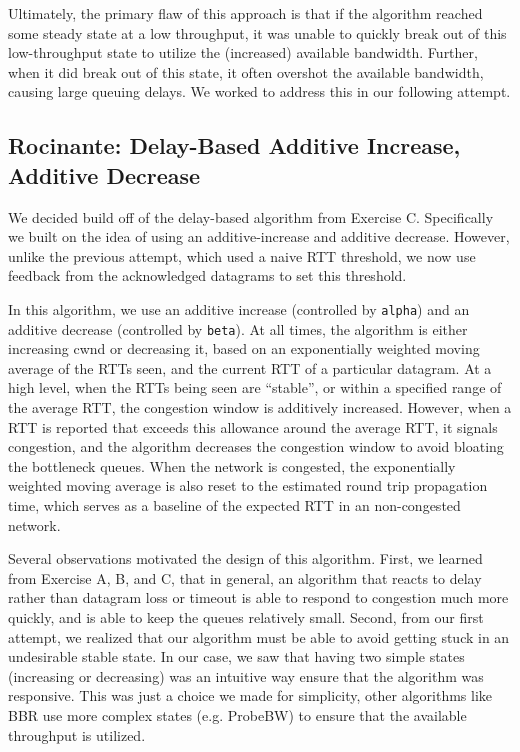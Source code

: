 \documentclass[twoside]{article}
\begin{document}
Ultimately, the primary flaw of this approach is that if the algorithm reached
some steady state at a low throughput, it was unable to quickly break out of
this low-throughput state to utilize the (increased) available bandwidth. Further,
when it did break out of this state, it often overshot the available bandwidth, causing
large queuing delays. We worked to address this in our following attempt.

\subsection*{Rocinante: Delay-Based Additive Increase, Additive Decrease}

We decided build off of the delay-based algorithm from
Exercise C. Specifically we built on the idea of using an additive-increase
and additive decrease. However, unlike the previous attempt, which used a
naive RTT threshold, we now use feedback from the acknowledged datagrams to set
this threshold.

In this algorithm, we use an additive increase (controlled by \texttt{alpha})
and an additive decrease (controlled by \texttt{beta}). At all times, the
algorithm is either increasing cwnd or decreasing it, based on an
exponentially weighted moving average of the RTTs seen, and the current RTT
of a particular datagram. At a high level, when the RTTs being seen are
``stable'', or within a specified range of the average RTT, the congestion
window is additively increased. However, when a RTT is reported that exceeds
this allowance around the average RTT, it signals congestion, and the algorithm
decreases the congestion window to avoid bloating the bottleneck queues.
When the network is congested, the exponentially weighted moving average is
also reset to the estimated round trip propagation time, which serves as a
baseline of the expected RTT in an non-congested network.

Several observations motivated the design of this algorithm. First, we learned
from Exercise A, B, and C, that in general, an algorithm that reacts to delay
rather than datagram loss or timeout is able to respond to congestion much more
quickly, and is able to keep the queues relatively small.
Second, from our first attempt, we realized that our algorithm must be able
to avoid getting stuck in an undesirable stable state. In our case, we saw
that having two simple states (increasing or decreasing) was an intuitive way
ensure that the algorithm was responsive. This was just a choice we made for
simplicity, other algorithms like BBR use more complex states (e.g. ProbeBW) to
ensure that the available throughput is utilized.
\end{document}
